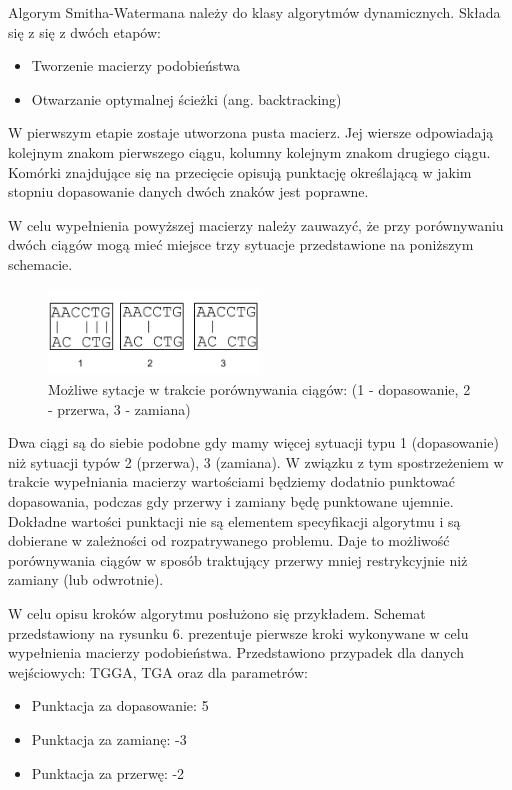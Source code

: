 \documentclass[a4paper,12pt]{article}
\newenvironment{lista}{
\begin{itemize}
  \setlength{\itemsep}{1pt}
  \setlength{\parskip}{0pt}
  \setlength{\parsep}{0pt}
}{\end{itemize}}
\begin{document}
Algorym Smitha-Watermana należy do klasy algorytmów dynamicznych. Składa się z się z dwóch etapów:
\begin{lista}
 \item Tworzenie macierzy podobieństwa
\item Otwarzanie optymalnej ścieżki (ang. backtracking)
\end{lista}

W pierwszym etapie zostaje utworzona pusta macierz. Jej wiersze odpowiadają kolejnym znakom pierwszego ciągu, kolumny kolejnym znakom drugiego ciągu. Komórki znajdujące się na przecięcie opisują punktację określającą w jakim stopniu dopasowanie danych dwóch znaków jest poprawne. 

W celu wypełnienia powyższej macierzy należy zauwazyć, że przy porównywaniu dwóch ciągów mogą mieć miejsce trzy sytuacje przedstawione na poniższym schemacie.

\begin{figure}[H]
  \vspace{5pt}
  \centering
  \begin{center}
  \includegraphics[width=0.5\textwidth]{images/TypySytuacjiPrzyDopasowaniu.png}
  \end{center}
  \caption{Możliwe sytacje w trakcie porównywania ciągów: (1 - dopasowanie, 2 - przerwa, 3 - zamiana)}
 \end{figure}


Dwa ciągi są do siebie podobne gdy mamy więcej sytuacji typu 1 (dopasowanie) niż sytuacji typów 2 (przerwa), 3 (zamiana). W związku z tym spostrzeżeniem w trakcie wypełniania macierzy wartościami będziemy dodatnio punktować dopasowania, podczas gdy przerwy i zamiany będę punktowane ujemnie. Dokładne wartości punktacji nie są elementem specyfikacji algorytmu i są dobierane w zależności od rozpatrywanego problemu. Daje to możliwość porównywania ciągów w sposób traktujący przerwy mniej restrykcyjnie niż zamiany (lub odwrotnie). 

W celu opisu kroków algorytmu posłużono się przykładem. Schemat przedstawiony na rysunku 6. prezentuje pierwsze kroki wykonywane w celu wypełnienia macierzy podobieństwa. Przedstawiono przypadek dla danych wejściowych: TGGA, TGA oraz dla parametrów:
\begin{lista}
\item Punktacja za dopasowanie: 5
\item Punktacja za zamianę: -3
\item Punktacja za przerwę: -2
\end{lista}
\end{document}
